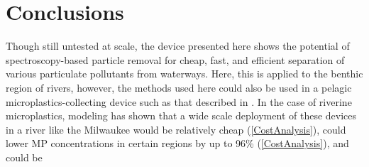 \documentclass[fleqn,10pt]{SelfArx} %
\begin{document}
	\section{Conclusions}
	Though still untested at scale, the device presented here shows the potential of spectroscopy-based particle removal for cheap, fast, and efficient separation of various particulate pollutants from waterways. Here, this is applied to the benthic region of rivers, however, the methods used here could also be used in a pelagic microplastics-collecting device such as that described in \cite{Isahaku}. In the case of riverine microplastics, modeling has shown that a wide scale deployment  of these devices in a river like the Milwaukee would be relatively cheap (\ref{CostAnalysis}), could lower MP concentrations in certain regions by up to 96\% (\ref{CostAnalysis}), and could be 
	
\end{document}

